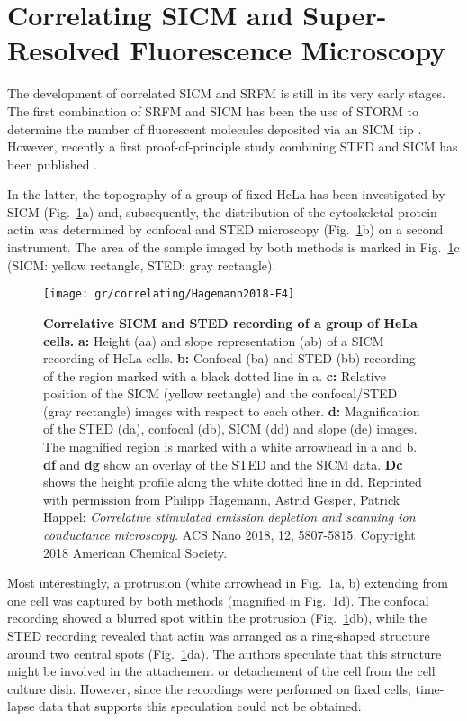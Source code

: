 \section{Correlating SICM and Super-Resolved Fluorescence Microscopy}
\label{sec:correlating-sicm-and-srfm}

The development of correlated
SICM and SRFM is still in its very early stages. The first combination of SRFM
and SICM has been the use of STORM to determine the number of fluorescent
molecules deposited via an SICM tip \cite{Hennig2015}. However, recently a
first proof-of-principle study combining STED and SICM has been published
\cite{Hagemann2018}.

In the latter, the topography of a group of fixed HeLa has been investigated
by SICM (Fig.~\ref{fig:SICM_STED1}a) and, subsequently, the distribution of
the cytoskeletal protein actin was determined by confocal and STED microscopy
(Fig.~\ref{fig:SICM_STED1}b) on a second instrument. The area of the sample
imaged by both methods is marked in Fig.~\ref{fig:SICM_STED1}c (SICM: yellow
rectangle, STED: gray rectangle).



\begin{figure}	
  \centering
    \texttt{[image: gr/correlating/Hagemann2018-F4]}
      \caption{
      \textbf{Correlative SICM and STED recording of a group of HeLa cells.} 
      \textbf{a:} Height (aa) and slope representation (ab) of a SICM recording
      of HeLa cells. \textbf{b:} Confocal (ba) and STED (bb) recording of the
      region marked  
      with a black dotted line in a. \textbf{c:}  Relative position of 
      the SICM (yellow rectangle) and the confocal/STED (gray rectangle)
      images with respect to each 
      other. \textbf{d:} Magnification of the STED (da), confocal (db), SICM
      (dd) and slope (de) images. The magnified region is marked with a white 
      arrowhead in a and b. \textbf{df} and \textbf{dg} show an overlay of 
      the STED and the SICM data. 
      \textbf{Dc} shows the height profile along the white dotted line in dd.  Reprinted 
      with permission from Philipp Hagemann, Astrid Gesper, Patrick Happel: \emph{Correlative 
      stimulated emission depletion and scanning ion conductance microscopy.} ACS Nano 2018, 
      12, 5807-5815. Copyright 2018 American Chemical Society.}
  \label{fig:SICM_STED1}
\end{figure}

Most interestingly, a protrusion (white arrowhead in
Fig.~\ref{fig:SICM_STED1}a, b) extending from one cell was captured by both
methods (magnified in Fig.~\ref{fig:SICM_STED1}d). The confocal recording
showed a blurred spot within the protrusion (Fig.~\ref{fig:SICM_STED1}db),
while the STED recording revealed that actin was arranged as a ring-shaped
structure around two central spots (Fig.~\ref{fig:SICM_STED1}da). The authors
speculate that this structure might be involved in the attachement or
detachement of the cell from the cell culture dish. However, since the
recordings were performed on fixed cells, time-lapse data that supports this
speculation could not be obtained.

